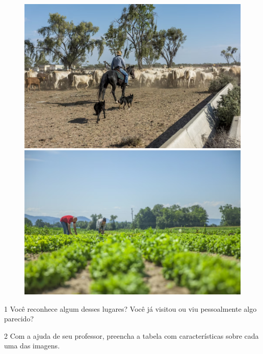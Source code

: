 \begin{figure}[htpb!]
\includegraphics[width=.5\textwidth]{./imgs/img55.png}
\includegraphics[width=.5\textwidth]{./imgs/img56.png}
\caption{}
\end{figure}


\num{1} Você reconhece algum desses lugares? Você já visitou ou viu pessoalmente algo parecido?


\num{2} Com a ajuda de seu professor, preencha a tabela com características
sobre cada uma das imagens.\bigskip

